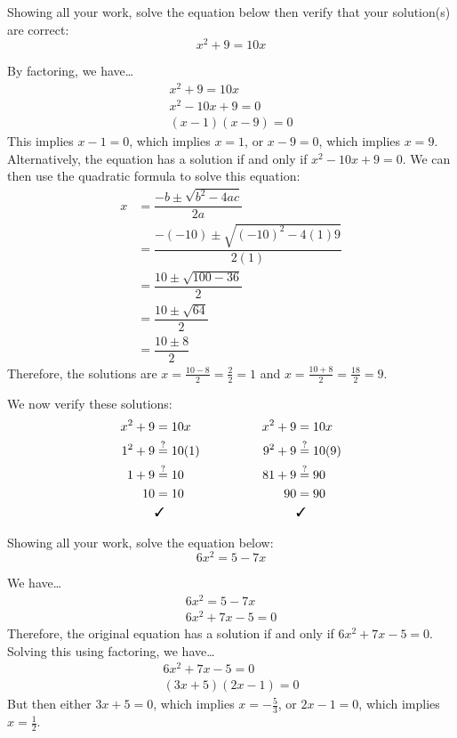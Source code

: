 \documentclass[12pt,letterpaper]{exam}
\begin{document}
\begin{questions}
\newpage
\question[10] Showing all your work, solve the equation below then verify that your solution(s) are correct:
	\[
	x^2 + 9= 10x
	\] \pspace

\sol By factoring, we have\dots
	\[
	\begin{gathered}
	x^2 + 9= 10x \\[0.3cm]
	x^2 - 10x + 9= 0 \\[0.3cm]
	(x - 1)(x - 9)= 0 
	\end{gathered}
	\]
This implies $x - 1= 0$, which implies $x= 1$, or $x - 9= 0$, which implies $x= 9$. Alternatively, the equation has a solution if and only if $x^2 - 10x + 9= 0$. We can then use the quadratic formula to solve this equation:
	\[
	\begin{aligned}
	x&= \dfrac{-b \pm \sqrt{b^2 - 4ac}}{2a} \\[0.3cm]
	&= \dfrac{-(-10) \pm \sqrt{(-10)^2 - 4(1)9}}{2(1)} \\[0.3cm]
	&= \dfrac{10 \pm \sqrt{100 - 36}}{2} \\[0.3cm]
	&= \dfrac{10 \pm \sqrt{64}}{2} \\[0.3cm]
	&= \dfrac{10 \pm 8}{2}
	\end{aligned}
	\]
Therefore, the solutions are $x= \frac{10 - 8}{2}= \frac{2}{2}= 1$ and $x= \frac{10 + 8}{2}= \frac{18}{2}= 9$. \pspace

We now verify these solutions:
	\[
	\begin{aligned}
	x^2 + 9&= 10x &\qquad\qquad x^2 + 9&= 10x \\
	1^2 + 9&\stackrel{?}{=} 10(1) & 9^2 + 9&\stackrel{?}{=} 10(9) \\
	1 + 9&\stackrel{?}{=} 10 & 81 + 9&\stackrel{?}{=} 90 \\
	10&= 10 & 90&= 90 \\
	&\text{\cmark} & &\text{\cmark}
	\end{aligned}
	\]



\newpage
\question[10] Showing all your work, solve the equation below:
	\[
	6x^2= 5 - 7x
	\] \pspace

\sol We have\dots
	\[
	\begin{gathered}
	6x^2= 5 - 7x \\[0.3cm]
	6x^2 + 7x - 5= 0
	\end{gathered}
	\]
Therefore, the original equation has a solution if and only if $6x^2 + 7x - 5= 0$. Solving this using factoring, we have\dots
	\[
	\begin{gathered}
	6x^2 + 7x - 5= 0 \\[0.3cm]
	(3x + 5)(2x - 1)= 0 
	\end{gathered}
	\]
But then either $3x + 5= 0$, which implies $x= -\frac{5}{3}$, or $2x - 1=0$, which implies $x= \frac{1}{2}$. \pspace


\end{questions}
\end{document}
